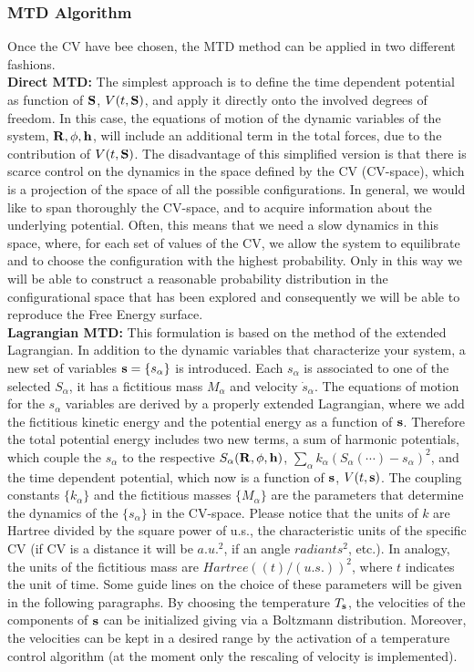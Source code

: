 \documentclass[twoside,10pt,titlepage,a4paper]{article}
\begin{document}
\subsubsection{MTD Algorithm}
Once the CV have bee chosen, the MTD method can be applied in two different fashions. \\
{\bf Direct MTD:} The simplest approach is to  define the time dependent
potential as function of ${\bf S}$, $V(t,{\bf S})$, and apply it directly onto
the involved degrees of freedom. In this case, the equations of motion of the
dynamic variables of the system, ${\bf R},{\bf \phi},{\bf h}$, will include
an additional term  in the total forces, due to the contribution of  $V(t,{\bf S})$.
The disadvantage of this simplified version is that there is scarce control
on the dynamics in the space defined by the CV (CV-space),
which is a projection of the space of all the possible configurations.
In general, we would like to span thoroughly the CV-space, and to acquire
information about the underlying potential.
Often, this means that we need a slow dynamics in this space,
where, for each set of values of the CV, we allow the system to equilibrate
and to choose the configuration with the highest probability.
Only in this way we will be able to construct a reasonable probability
distribution in the configurational space that has been explored and
consequently we will be able to reproduce the Free Energy surface.    \\
{\bf Lagrangian MTD:} This formulation is based on the method of the
extended Lagrangian. In addition to the dynamic variables that
characterize your system, a new set of variables
${\bf s}=\{s_{\alpha}\}$ is introduced.
Each $s_{\alpha}$ is associated to one of the selected $S_{\alpha}$,
it has a fictitious mass $M_{\alpha}$ and velocity $\dot{s}_{\alpha}$.
The equations of motion for the $s_{\alpha}$ variables are derived by
a properly extended Lagrangian, where we add the fictitious kinetic
energy and the potential energy as a function of ${\bf s}$.
Therefore the total potential energy includes two new terms,
a sum of harmonic potentials, which couple the $s_\alpha$
to the respective $S_{\alpha}({\bf R},{\bf \phi},{\bf h})$,
$\sum_{\alpha}k_{\alpha}(S_{\alpha}(\cdots)-s_{\alpha})^{2}$,
and the time dependent potential, which now is a function of ${\bf s}$, $V(t,{\bf s})$.
The coupling constants $\{k_{\alpha}\}$ and the fictitious masses $\{M_{\alpha}\}$
are the parameters that determine the dynamics of the $\{s_{\alpha}\}$
in the CV-space. Please notice that the units of $k$ are Hartree
divided by the square power of u.s., the characteristic units of the
specific CV (if CV is a distance it will be $a.u.^2$,
if an angle $radiants^2$, etc.). In analogy, the units of the
fictitious mass are $Hartree ((t)/(u.s.))^2$, where $t$ indicates the unit of time.
Some guide lines on the choice of these parameters will be given in the following paragraphs.
By choosing the temperature $T_{\bf s}$, the velocities of the components
of $\bf s$ can be initialized giving via a Boltzmann distribution.
Moreover, the velocities can be kept in a desired range by the
activation of a temperature control algorithm (at the moment only the
rescaling of velocity is  implemented).
\end{document}
